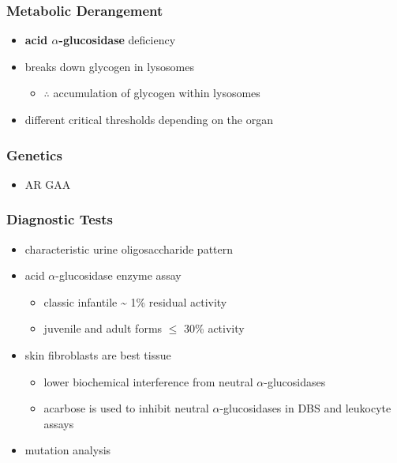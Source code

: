 \documentclass[12pt]{scrartcl}
\begin{document}
\subsubsection{Metabolic Derangement}
\label{sec:org9e9b6d9}
\begin{itemize}
\item \textbf{acid \(\alpha\)-glucosidase} deficiency
\item breaks down glycogen in lysosomes
\begin{itemize}
\item \(\therefore\) accumulation of glycogen within lysosomes
\end{itemize}
\item different critical thresholds depending on the organ
\end{itemize}
\subsubsection{Genetics}
\label{sec:org7ed7fc0}
\begin{itemize}
\item AR GAA
\end{itemize}

\subsubsection{Diagnostic Tests}
\label{sec:org3656d23}
\begin{itemize}
\item characteristic urine oligosaccharide pattern
\item acid \(\alpha\)-glucosidase enzyme assay
\begin{itemize}
\item classic infantile \textasciitilde{} 1\% residual activity
\item juvenile and adult forms \(\le\) 30\% activity
\end{itemize}
\item skin fibroblasts are best tissue
\begin{itemize}
\item lower biochemical interference from neutral \(\alpha\)-glucosidases
\item acarbose is used to inhibit neutral \(\alpha\)-glucosidases in DBS and leukocyte assays
\end{itemize}
\item mutation analysis
\end{itemize}
\end{document}

